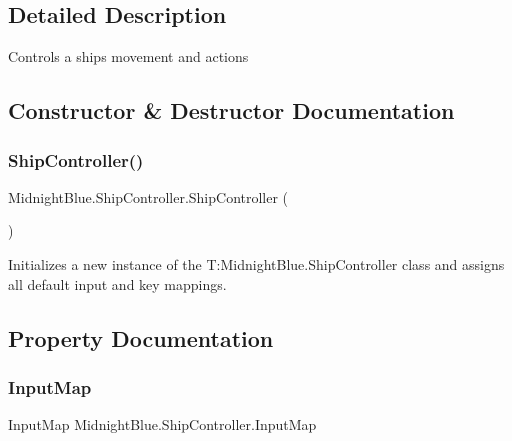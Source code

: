 \subsection{Detailed Description}
Controls a ships movement and actions 



\subsection{Constructor \& Destructor Documentation}
\hypertarget{class_midnight_blue_1_1_ship_controller_a07d38d2b98b9b132f1eff9cc8879f278}{}\label{class_midnight_blue_1_1_ship_controller_a07d38d2b98b9b132f1eff9cc8879f278} 
\subsubsection{\texorpdfstring{Ship\+Controller()}{ShipController()}}
{\footnotesize\ttfamily Midnight\+Blue.\+Ship\+Controller.\+Ship\+Controller (\begin{DoxyParamCaption}{ }\end{DoxyParamCaption})\hspace{0.3cm}{\ttfamily [inline]}}



Initializes a new instance of the T\+:\+Midnight\+Blue.\+Ship\+Controller class and assigns all default input and key mappings. 



\subsection{Property Documentation}
\hypertarget{class_midnight_blue_1_1_ship_controller_a50136c59b5a0e80d280aec4b6de46414}{}\label{class_midnight_blue_1_1_ship_controller_a50136c59b5a0e80d280aec4b6de46414} 
\subsubsection{\texorpdfstring{Input\+Map}{InputMap}}
{\footnotesize\ttfamily Input\+Map Midnight\+Blue.\+Ship\+Controller.\+Input\+Map\hspace{0.3cm}{\ttfamily [get]}}



